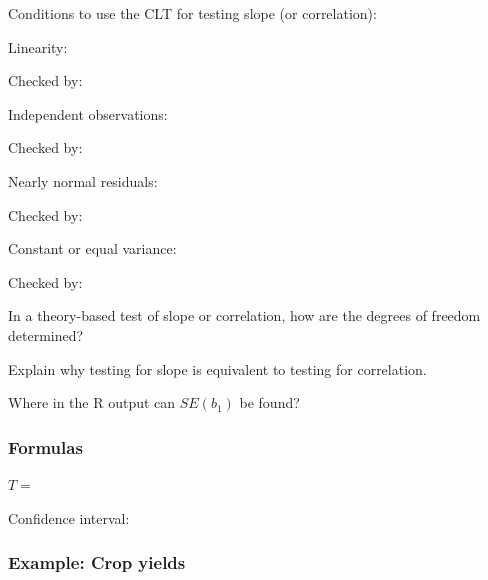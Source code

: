 \documentclass[
]{report}
\newcommand{\rgs}{\vspace{12pt}} %
\newcommand{\rgi}{\hspace{24pt}}  %
\begin{document}
Conditions to use the CLT for testing slope (or correlation):

\rgi Linearity:
\rgs

\rgi \rgi Checked by:
\rgs

\rgi Independent observations:
\rgs

\rgi \rgi Checked by:
\rgs

\rgi Nearly normal residuals:
\rgs

\rgi \rgi Checked by:
\rgs

\rgi Constant or equal variance:
\rgs

\rgi \rgi Checked by:
\rgs

In a theory-based test of slope or correlation, how are the degrees of freedom determined?
\rgs    

Explain why testing for slope is equivalent to testing for correlation.
\rgs

Where in the R output can \(SE(b_1)\) be found?
\rgs

\hypertarget{formulas-7}{%
\subsubsection*{Formulas}\label{formulas-7}}

\(T=\)
\rgs

Confidence interval:
\rgs

\hypertarget{example-crop-yields}{%
\subsubsection*{Example: Crop yields}\label{example-crop-yields}}
\end{document}
